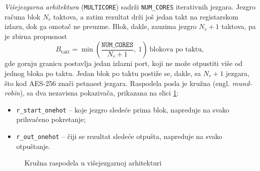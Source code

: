 \smallbreak
\textit{Višejezgarna arhitektura} (\texttt{MULTICORE}) sadrži \texttt{NUM\_CORES} iterativnih jezgara. Jezgro računa blok $N_r$ taktova, a zatim rezultat drži još jedan takt na registarskom izlazu, dok ga omotač ne preuzme. Blok, dakle, zauzima jezgro $N_r + 1$ taktova, pa je zbirna propusnost
\begin{equation}
    \label{eq:multicore_propusnost}
    B_{\mathrm{takt}} = \min\!\left(\frac{\texttt{NUM\_CORES}}{N_r + 1},\ 1\right) \ \text{blokova po taktu},
\end{equation}
gde gornju granicu postavlja jedan izlazni port, koji ne može otpustiti više od jednog bloka po taktu. Jedan blok po taktu postiže se, dakle, sa $N_r + 1$ jezgara, što kod AES-256 znači petnaest jezgara. Raspodela posla je kružna (engl. \textit{round-robin}), sa dva nezavisna pokazivača, prikazana na slici \ref{fig:aes_rr}:
\begin{itemize}[itemsep=2pt]
    \item \texttt{r\_start\_onehot} -- koje jezgro sledeće prima blok, napreduje na svako prihvaćeno pokretanje;
    \item \texttt{r\_out\_onehot} -- čiji se rezultat sledeće otpušta, napreduje na svako otpuštanje.
\end{itemize}

\begin{figure}[H]
\centering
{}
\caption{Kružna raspodela u višejezgarnoj arhitekturi}
\label{fig:aes_rr}
\end{figure}


